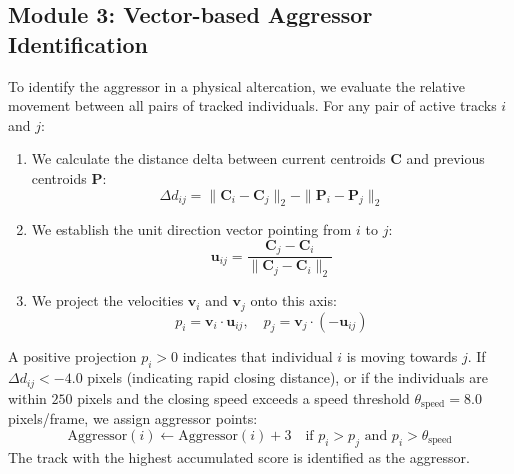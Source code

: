 \documentclass[conference]{IEEEtran}
\begin{document}
\subsection{Module 3: Vector-based Aggressor Identification}
To identify the aggressor in a physical altercation, we evaluate the relative movement between all pairs of tracked individuals. For any pair of active tracks $i$ and $j$:
\begin{enumerate}
    \item We calculate the distance delta between current centroids $\mathbf{C}$ and previous centroids $\mathbf{P}$:
    \begin{equation}
    \Delta d_{ij} = \|\mathbf{C}_i - \mathbf{C}_j\|_2 - \|\mathbf{P}_i - \mathbf{P}_j\|_2
    \end{equation}
    \item We establish the unit direction vector pointing from $i$ to $j$:
    \begin{equation}
    \mathbf{u}_{ij} = \frac{\mathbf{C}_j - \mathbf{C}_i}{\|\mathbf{C}_j - \mathbf{C}_i\|_2}
    \end{equation}
    \item We project the velocities $\mathbf{v}_i$ and $\mathbf{v}_j$ onto this axis:
    \begin{equation}
    p_i = \mathbf{v}_i \cdot \mathbf{u}_{ij}, \quad p_j = \mathbf{v}_j \cdot (-\mathbf{u}_{ij})
    \end{equation}
\end{enumerate}
A positive projection $p_i > 0$ indicates that individual $i$ is moving towards $j$. If $\Delta d_{ij} < -4.0$ pixels (indicating rapid closing distance), or if the individuals are within $250$ pixels and the closing speed exceeds a speed threshold $\theta_{\text{speed}} = 8.0$ pixels/frame, we assign aggressor points:
\begin{equation}
\text{Aggressor}(i) \gets \text{Aggressor}(i) + 3 \quad \text{if } p_i > p_j \text{ and } p_i > \theta_{\text{speed}}
\end{equation}
The track with the highest accumulated score is identified as the aggressor.
\end{document}
